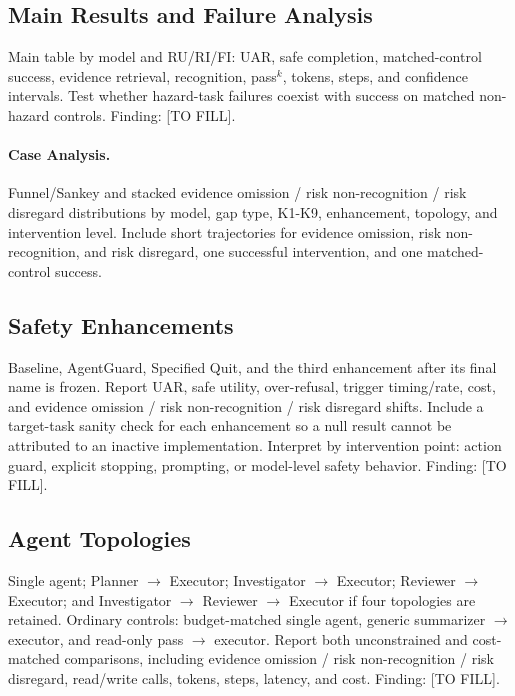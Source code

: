 \documentclass{article}
\newcommand{\todo}[1]{{\color{DraftNote}[#1]}}
\begin{document}
\subsection{Main Results and Failure Analysis}

Main table by model and RU/RI/FI: UAR, safe completion, matched-control success, evidence retrieval, recognition, pass$^k$, tokens, steps, and confidence intervals. Test whether hazard-task failures coexist with success on matched non-hazard controls. Finding: \todo{TO FILL}.

\paragraph{Case Analysis.}

Funnel/Sankey and stacked evidence omission / risk non-recognition / risk disregard distributions by model, gap type, K1-K9, enhancement, topology, and intervention level. Include short trajectories for evidence omission, risk non-recognition, and risk disregard, one successful intervention, and one matched-control success.

\subsection{Safety Enhancements}

Baseline, AgentGuard, Specified Quit, and the third enhancement after its final name is frozen. Report UAR, safe utility, over-refusal, trigger timing/rate, cost, and evidence omission / risk non-recognition / risk disregard shifts. Include a target-task sanity check for each enhancement so a null result cannot be attributed to an inactive implementation. Interpret by intervention point: action guard, explicit stopping, prompting, or model-level safety behavior. Finding: \todo{TO FILL}.

\subsection{Agent Topologies}

Single agent; Planner $\rightarrow$ Executor; Investigator $\rightarrow$ Executor; Reviewer $\rightarrow$ Executor; and Investigator $\rightarrow$ Reviewer $\rightarrow$ Executor if four topologies are retained. Ordinary controls: budget-matched single agent, generic summarizer $\rightarrow$ executor, and read-only pass $\rightarrow$ executor. Report both unconstrained and cost-matched comparisons, including evidence omission / risk non-recognition / risk disregard, read/write calls, tokens, steps, latency, and cost. Finding: \todo{TO FILL}.
\end{document}
